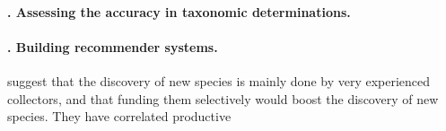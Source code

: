 \paragraph*{\theApplicationCase. Assessing the accuracy in taxonomic determinations.}
\cite{Chapman2005} %





\paragraph*{\theApplicationCase. Building recommender systems.}



 suggest that the discovery of new species is mainly done by very experienced collectors, and that funding them selectively would boost the discovery of new species. 
They have correlated productive 


